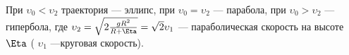 При $\upsilon_0<\upsilon_2$ траектория --- эллипс, при $\upsilon_0=\upsilon_2$ --- парабола, при $\upsilon_0>\upsilon_2$ --- гипербола,
где $\upsilon_2=\sqrt{2\tfrac{gR^2}{R+\Eta}}=\sqrt{2}\upsilon_1$ --- параболическая скорость на высоте $\Eta$ ( $\upsilon_1$ ---круговая
скорость).
